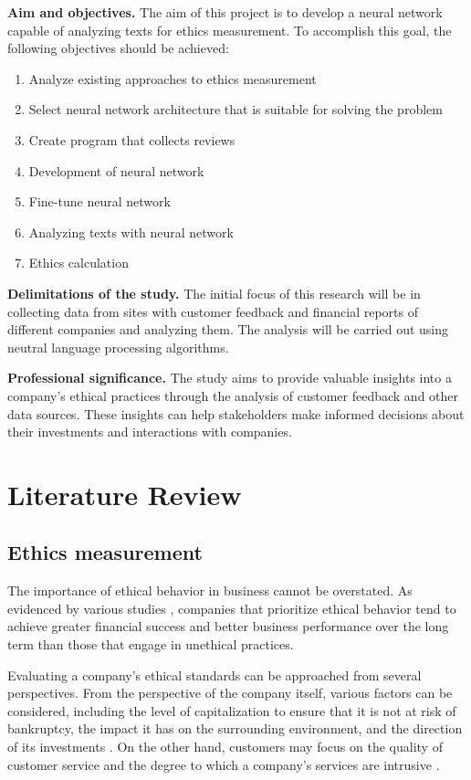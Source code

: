 \documentclass[PI]{ProjectProposal}
\begin{document}
\textbf{Aim and objectives.} The aim of this project is to develop a neural network capable of analyzing texts for ethics measurement. To accomplish this goal, the following objectives should be achieved:
\begin{enumerate}
\item Analyze existing approaches to ethics measurement
\item Select neural network architecture that is suitable for solving the problem
\item Create program that collects reviews
\item Development of neural network
\item Fine-tune neural network
\item Analyzing texts with neural network
\item Ethics calculation
\end{enumerate}

\textbf{Delimitations of the study.} The initial focus of this research will be in collecting data from sites with customer feedback and financial reports of different companies and analyzing them. The analysis will be carried out using neutral language processing algorithms.

\textbf{Professional significance.} The study aims to provide valuable insights into a company's ethical practices through the analysis of customer feedback and other data sources. These insights can help stakeholders make informed decisions about their investments and interactions with companies.
\chapter{Literature Review}
\label{sec:orgb760b38}
\section{Ethics measurement}
\label{sec:orgd14e181}
The importance of ethical behavior in business cannot be overstated. As evidenced by various studies \autocites{climent_ethical_2018}[][]{mure_esg_2021}, companies that prioritize ethical behavior tend to achieve greater financial success and better business performance over the long term than those that engage in unethical practices.

Evaluating a company's ethical standards can be approached from several perspectives. From the perspective of the company itself, various factors can be considered, including the level of capitalization to ensure that it is not at risk of bankruptcy, the impact it has on the surrounding environment, and the direction of its investments \autocite{harvey1995ethical}. On the other hand, customers may focus on the quality of customer service \autocite{brunk2010exploring} and the degree to which a company's services are intrusive \autocite{mitchell1992bank}.
\end{document}
